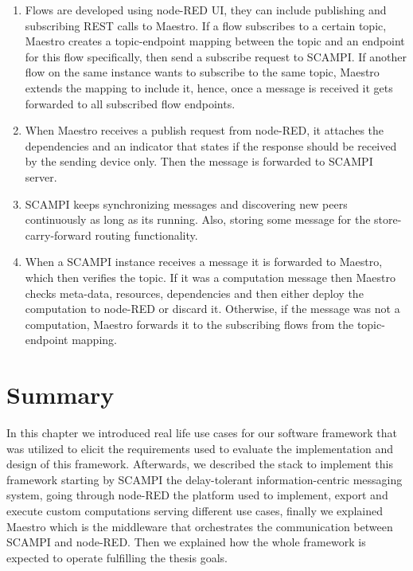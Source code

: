 \begin{enumerate}[label=(\Alph*)]
 
 \item Flows are developed using node-RED UI, they can include publishing and subscribing REST calls to Maestro. If a flow subscribes to a certain topic, Maestro creates  a topic-endpoint mapping between the topic and an endpoint for this flow specifically, then send a subscribe request to SCAMPI. If another flow on the same instance wants to subscribe to the same topic, Maestro extends the mapping to include it, hence, once a message is received it gets forwarded to all subscribed flow endpoints. 

 \item When Maestro receives a publish request from node-RED, it attaches the dependencies and an indicator that states if the response should be received by the sending device only. Then the message is forwarded to SCAMPI server.

 \item SCAMPI keeps synchronizing messages and discovering new peers continuously as long as its running. Also, storing some message for the store-carry-forward routing functionality.

 \item When a SCAMPI instance receives a message it is forwarded to Maestro, which then verifies the topic. If it was a computation message then Maestro checks meta-data, resources, dependencies and then either deploy the computation to node-RED or discard it. Otherwise, if the message was not a computation, Maestro forwards it to the subscribing flows from the topic-endpoint mapping. 

\end{enumerate}

\section{Summary}

In this chapter we introduced real life use cases for our software framework that was utilized to elicit the requirements used to evaluate the implementation and design of this framework. Afterwards, we described the stack  to implement this framework starting by SCAMPI the  delay-tolerant information-centric messaging system, going through node-RED the platform used to implement, export and execute custom computations serving different use cases, finally we explained Maestro which is the middleware that orchestrates the communication between SCAMPI and node-RED. Then we explained how the whole framework is expected to operate  fulfilling  the thesis goals.